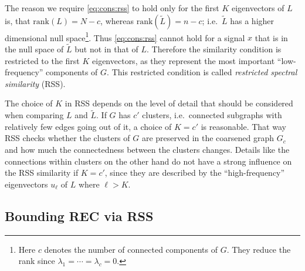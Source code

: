 The reason we require \cref{eq:cons:rss} to hold only for the first $K$ eigenvectors of $L$ is, that $\text{rank}(L) = N - c$, whereas $\text{rank}(\widetilde{L}) = n - c$;
i.e.\ $\widetilde{L}$ has a higher dimensional null space\footnote{%
	Here $c$ denotes the number of connected components of $G$.
	They reduce the rank since $\lambda_1 = \cdots = \lambda_c = 0$.
}.
Thus \cref{eq:cons:rss} cannot hold for a signal $x$ that is in the null space of $\widetilde{L}$ but not in that of $L$.
Therefore the similarity condition is restricted to the first $K$ eigenvectors, as they represent the most important ``low-frequency'' components of $G$.
This restricted condition is called \textit{restricted spectral similarity} (RSS).

The choice of $K$ in RSS depends on the level of detail that should be considered when comparing $L$ and $\widetilde{L}$.
If $G$ has $c'$ clusters, i.e.\ connected subgraphs with relatively few edges going out of it, a choice of $K = c'$ is reasonable.
That way RSS checks whether the clusters of $G$ are preserved in the coarsened graph $G_c$ and how much the connectedness between the clusters changes.
Details like the connections within clusters on the other hand do not have a strong influence on the RSS similarity if $K = c'$, since they are described by the ``high-frequency'' eigenvectors $u_\ell$ of $L$ where $\ell > K$.

\subsection{Bounding REC via RSS}%
\label{sec:cons:bound}

